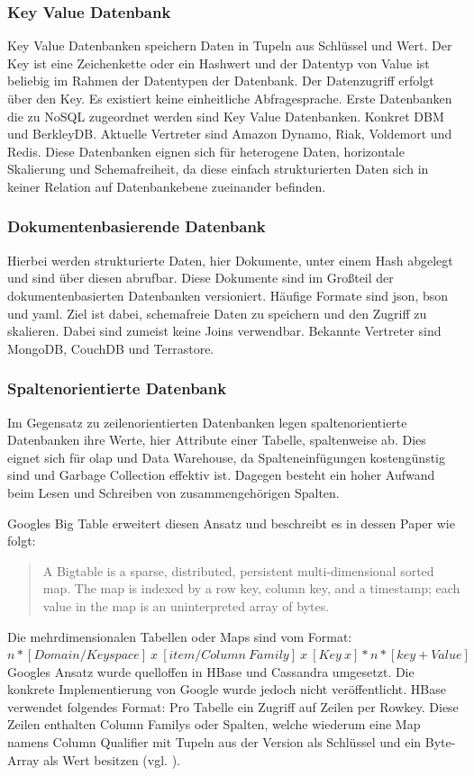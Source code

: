 \subsubsection{Key Value Datenbank}
Key Value Datenbanken speichern Daten in Tupeln aus Schlüssel und Wert.
Der Key ist eine Zeichenkette oder ein Hashwert und der Datentyp von Value ist beliebig im Rahmen der Datentypen der Datenbank.
Der Datenzugriff erfolgt über den Key.
Es existiert keine einheitliche Abfragesprache.
Erste Datenbanken die zu NoSQL zugeordnet werden sind Key Value Datenbanken. Konkret DBM und BerkleyDB.
Aktuelle Vertreter sind Amazon Dynamo, Riak, Voldemort und Redis.
Diese Datenbanken eignen sich für heterogene Daten, horizontale Skalierung und Schemafreiheit, da diese einfach strukturierten Daten sich in keiner Relation auf Datenbankebene zueinander befinden.

\subsubsection{Dokumentenbasierende Datenbank}
Hierbei werden strukturierte Daten, hier Dokumente, unter einem Hash abgelegt und sind über diesen abrufbar.
Diese Dokumente sind im Großteil der dokumentenbasierten Datenbanken versioniert.
Häufige Formate sind \Gls{json}, \Gls{bson} und \Gls{yaml}.
Ziel ist dabei, schemafreie Daten zu speichern und den Zugriff zu skalieren.
Dabei sind zumeist keine Joins verwendbar.
Bekannte Vertreter sind MongoDB, CouchDB und Terrastore.

\subsubsection{Spaltenorientierte Datenbank}
Im Gegensatz zu zeilenorientierten Datenbanken legen spaltenorientierte Datenbanken ihre Werte, hier Attribute einer Tabelle, spaltenweise ab.
Dies eignet sich für \Gls{olap} und Data Warehouse, da Spalteneinfügungen kostengünstig sind und Garbage Collection effektiv ist.
Dagegen besteht ein hoher Aufwand beim Lesen und Schreiben von zusammengehörigen Spalten.

Googles Big Table erweitert diesen Ansatz und beschreibt es in dessen Paper wie folgt:
\begin{quote}
A  Bigtable  is  a  sparse,  distributed,  persistent  multi-dimensional sorted map. The map is indexed by a row key, column key, and a timestamp; each value in the map is an uninterpreted array of bytes. \cite[S.1]{paper:bigtable}
\end{quote}
Die mehrdimensionalen Tabellen oder Maps sind vom Format:\\
$n*[Domain / Keyspace]\ x\ [item / Column\ Family]\ x\ [Key\ x]*n*[key+Value]$\\
Googles Ansatz wurde quelloffen in HBase und Cassandra umgesetzt. Die konkrete Implementierung von Google wurde jedoch nicht veröffentlicht.
HBase verwendet folgendes Format:
Pro Tabelle ein Zugriff auf Zeilen per Rowkey.
Diese Zeilen enthalten Column Familys oder Spalten, welche wiederum eine Map namens Column Qualifier mit Tupeln aus der Version als Schlüssel und ein Byte-Array als Wert besitzen (vgl. \cite[S.13]{ba:dan}).

